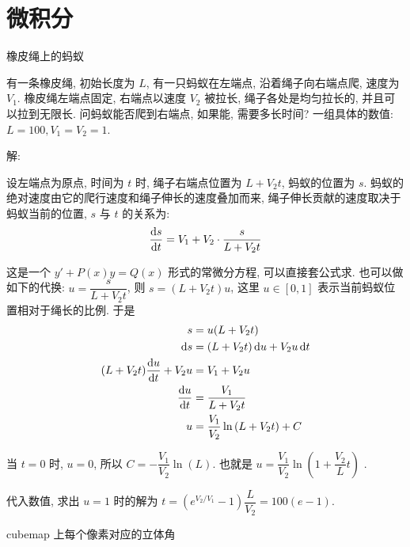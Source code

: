 \chapter{微积分}

\noindent 橡皮绳上的蚂蚁

有一条橡皮绳, 初始长度为 $L$, 有一只蚂蚁在左端点, 沿着绳子向右端点爬, 速度为 $ V_1 $. 橡皮绳左端点固定, 右端点以速度 $ V_2 $ 被拉长, 绳子各处是均匀拉长的, 并且可以拉到无限长. 问蚂蚁能否爬到右端点, 如果能, 需要多长时间? 一组具体的数值: $ L = 100, V_1=V_2=1 $.

\noindent 解:

设左端点为原点, 时间为 $ t $ 时, 绳子右端点位置为 $ L + V_2 t $, 蚂蚁的位置为 $ s $. 蚂蚁的绝对速度由它的爬行速度和绳子伸长的速度叠加而来, 绳子伸长贡献的速度取决于蚂蚁当前的位置, $ s $ 与 $ t $ 的关系为:
\[
\dv{s}{t} = V_1 + V_2\cdot\frac{s}{L+V_2 t}
\]

这是一个 $ y' + P(x)y = Q(x) $ 形式的常微分方程, 可以直接套公式求. 也可以做如下的代换: $ u = \dfrac{s}{L+V_2t} $, 则 $ s = (L+V_2t)u $, 这里 $ u\in[0,1] $ 表示当前蚂蚁位置相对于绳长的比例. 于是
\begin{align*}
s &= u(L+V_2t) \\
\dd{s} &= (L+V_2t)\dd{u} + V_2u\dd{t} \\
(L+V_2t)\dv{u}{t}+V_2u &=V_1+V_2u \\
\dv{u}{t} &=\frac{V_1}{L+V_2t} \\
u &= \frac{V_1}{V_2}\ln{(L+V_2t)} + C
\end{align*}

当 $ t = 0 $ 时, $ u = 0 $, 所以 $ C = -\dfrac{V_1}{V_2}\ln(L) $. 也就是 $ u = \dfrac{V_1}{V_2}\ln{(1+\dfrac{V_2}{L}t)}$ .

代入数值, 求出 $ u = 1 $ 时的解为 $ t = \left(e^{{V_2}/{V_1}}-1\right)\dfrac{L}{V_2} = 100(e-1)$.


\newpage
\noindent cubemap 上每个像素对应的立体角

